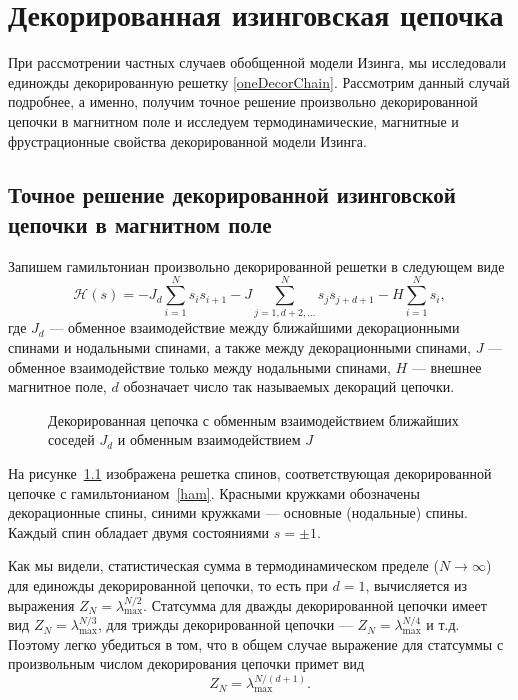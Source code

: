 \chapter{Декорированная изинговская цепочка}\label{ch:ch3}

При рассмотрении частных случаев обобщенной модели Изинга, мы исследовали единожды декорированную решетку \ref{oneDecorChain}. Рассмотрим данный случай подробнее, а именно, получим точное решение произвольно декорированной цепочки в магнитном поле и исследуем термодинамические, магнитные и фрустрационные свойства декорированной модели Изинга. 

\section{Точное решение декорированной изинговской цепочки в магнитном поле}\label{sec:ch3/sect1}

Запишем гамильтониан произвольно декорированной решетки в следующем виде
\begin{equation}
\mathcal{H}(s) = -J_{d}\sum_{i=1}^{N} s_{i} s_{i+1} - J\sum_{j=1,d+2,\dots}^{N} s_{j}s_{j+d+1} - H \sum_{i=1}^{N} s_{i},
\label{ham}
\end{equation}
где $J_d$ --- обменное взаимодействие между ближайшими декорационными спинами и нодальными спинами, а также между декорационными спинами, $J$ --- обменное взаимодействие только между нодальными спинами, $H$ --- внешнее магнитное поле, $d$ обозначает число так называемых \guillemotleft декораций\guillemotright $ $ цепочки.

 \begin{figure}[h]
 	\caption{Декорированная цепочка с обменным взаимодействием ближайших соседей $J_d$ и обменным взаимодействием $J$}
 	\label{decorChain}
 \end{figure}

На рисунке~\ref{decorChain} изображена решетка спинов, соответствующая декорированной цепочке с гамильтонианом~\eqref{ham}.
Красными кружками обозначены декорационные спины, синими кружками --- основные (нодальные) спины.
Каждый спин обладает двумя состояниями $s=\pm 1$.

Как мы видели, статистическая сумма в термодинамическом пределе ($N\rightarrow \infty$) для единожды декорированной цепочки, то есть при $d=1$, вычисляется из выражения $Z_{N} = \lambda_{\text{max}}^{N/2}$. Статсумма для дважды декорированной цепочки имеет вид $Z_{N} = \lambda_{\text{max}}^{N/3}$, для трижды декорированной цепочки --- $Z_{N} = \lambda_{\text{max}}^{N/4}$ и  т.д. Поэтому легко убедиться в том, что в общем случае выражение для статсуммы с произвольным числом декорирования цепочки примет вид 
\begin{equation}
Z_{N} = \lambda_{\text{max}}^{N/(d+1)}.
\label{zn}
\end{equation}

